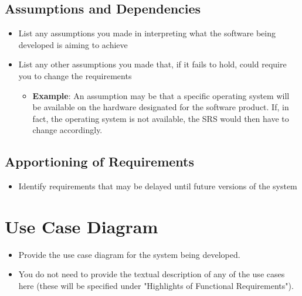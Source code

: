 \documentclass[]{article}
\begin{document}
\subsection{Assumptions and Dependencies}
\label{sub:assumptions_and_dependencies}
\begin{itemize}
	\item List any assumptions you made in interpreting what the software being developed is aiming to achieve
	\item List any other assumptions you made that, if it fails to hold, could require you to change the requirements
	\begin{itemize}
		\item \textbf{Example}: An assumption may be that a specific operating system will be available on the hardware designated for the software product. If, in fact, the operating system is not available, the SRS would then have to change accordingly.
	\end{itemize}
\end{itemize}

\subsection{Apportioning of Requirements}
\label{sub:apportioning_of_requirements}
\begin{itemize}
	\item Identify requirements that may be delayed until future versions of the system
\end{itemize}

\section{Use Case Diagram}
\label{sec:use_case_diagram}
\begin{itemize}
	\item Provide the use case diagram for the system being developed.
	\item You do not need to provide the textual description of any of the use cases here (these will be specified under "Highlights of Functional Requirements").
\end{itemize}
\end{document}
